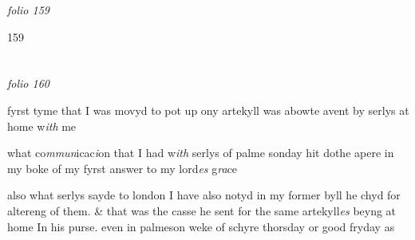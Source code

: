 \documentclass[12pt, a4paper]{book}
\begin{document}
\dotfill
					

\textit{folio 159}


\begin{flushright}{\color{Mahogany}159}\end{flushright}

\dotfill
					  \section*{}  \subsection*{}

\textit{folio 160}




            		
            			
				\marginpar[\vspace{0.5cm}{\textcolor{Gray}{i.}}]{}
			
            			
		\ifthenelse{\isodd{\thepage}}
		{\reversemarginpar}
		{\normalmarginpar}
		fyrst tyme that I was movyd to pot up ony artekyll was
	abowte avent by serlys at home w\textit{ith} me
            		
            		
            			
				\marginpar[\vspace{0.5cm}{\textcolor{Gray}{2.}}]{}
			
            			
		\ifthenelse{\isodd{\thepage}}
		{\reversemarginpar}
		{\normalmarginpar}
		what co\textit{mmun}icac\textit{i}on that I had w\textit{ith} serlys of palme sonday hit
            				dothe apere in my boke of my fyrst answer to my lord\textit{es} g\textit{ra}ce

            	
				\marginpar[\vspace{0.5cm}{\textcolor{Gray}{3.}}]{}
			
		\ifthenelse{\isodd{\thepage}}
		{\reversemarginpar}
		{\normalmarginpar}
		also what serlys sayde to london I have also notyd in my former
 byll he chyd for altereng of them. \& that was the casse he sent
 for the same artekyll\textit{es} beyng at home In his purse.
 even in palmeson weke of schyre thorsday or good fryday as
 

            	
				\marginpar[\vspace{0.5cm}{\textcolor{Gray}{4.}}]{}
			
\end{document}
